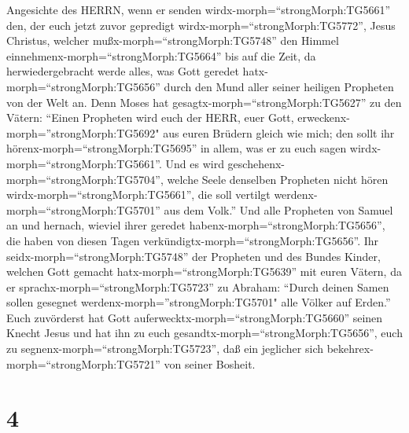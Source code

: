 Angesichte des HERRN, wenn er senden wirdx-morph=``strongMorph:TG5661''
den, der euch jetzt zuvor gepredigt wirdx-morph=``strongMorph:TG5772'',
Jesus Christus,  welcher mußx-morph=``strongMorph:TG5748''
den Himmel einnehmenx-morph=``strongMorph:TG5664'' bis auf die Zeit, da
herwiedergebracht werde alles, was Gott geredet
hatx-morph=``strongMorph:TG5656'' durch den Mund aller seiner heiligen
Propheten von der Welt an.  Denn Moses hat
gesagtx-morph=``strongMorph:TG5627'' zu den Vätern: ``Einen Propheten
wird euch der HERR, euer Gott, erweckenx-morph=''strongMorph:TG5692" aus
euren Brüdern gleich wie mich; den sollt ihr
hörenx-morph=``strongMorph:TG5695'' in allem, was er zu euch sagen
wirdx-morph=``strongMorph:TG5661''.  Und es wird
geschehenx-morph=``strongMorph:TG5704'', welche Seele denselben
Propheten nicht hören wirdx-morph=``strongMorph:TG5661'', die soll
vertilgt werdenx-morph=``strongMorph:TG5701'' aus dem Volk.''
 Und alle Propheten von Samuel an und hernach, wieviel
ihrer geredet habenx-morph=``strongMorph:TG5656'', die haben von diesen
Tagen verkündigtx-morph=``strongMorph:TG5656''.  Ihr
seidx-morph=``strongMorph:TG5748'' der Propheten und des Bundes Kinder,
welchen Gott gemacht hatx-morph=``strongMorph:TG5639'' mit euren Vätern,
da er sprachx-morph=``strongMorph:TG5723'' zu Abraham: ``Durch deinen
Samen sollen gesegnet werdenx-morph=''strongMorph:TG5701" alle Völker
auf Erden.''  Euch zuvörderst hat Gott
auferwecktx-morph=``strongMorph:TG5660'' seinen Knecht Jesus und hat ihn
zu euch gesandtx-morph=``strongMorph:TG5656'', euch zu
segnenx-morph=``strongMorph:TG5723'', daß ein jeglicher sich
bekehrex-morph=``strongMorph:TG5721'' von seiner Bosheit.

\hypertarget{section-3}{%
\section{4}\label{section-3}}

